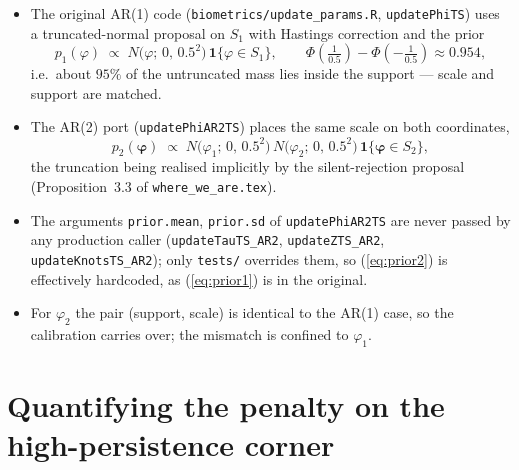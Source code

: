 \documentclass[11pt]{article}
\newcommand{\eref}[1]{(\ref{#1})}
\newcommand{\bphi}{\boldsymbol{\varphi}}
\newcommand{\ind}{\mathbf{1}}
\theoremstyle{plain}
\theoremstyle{definition}
\theoremstyle{remark}
\begin{document}
\begin{itemize}
  \item The original AR(1) code (\texttt{biometrics/update\_params.R},
        \texttt{updatePhiTS}) uses a truncated-normal proposal on $S_1$ with
        Hastings correction and the prior
        \begin{equation}\label{eq:prior1}
          p_1(\varphi)
          \;\propto\;
          N\!\bigl( \varphi ;\, 0,\, 0.5^2 \bigr)\,
          \ind\{ \varphi \in S_1 \},
          \qquad
          \Phi\!\left( \tfrac{1}{0.5} \right)
          - \Phi\!\left( -\tfrac{1}{0.5} \right)
          \approx 0.954,
        \end{equation}
        i.e.\ about $95\%$ of the untruncated mass lies inside the support
        --- scale and support are matched.
  \item The AR(2) port (\texttt{updatePhiAR2TS}) places the same scale on
        both coordinates,
        \begin{equation}\label{eq:prior2}
          p_2(\bphi)
          \;\propto\;
          N\!\bigl( \varphi_1 ;\, 0,\, 0.5^2 \bigr)\,
          N\!\bigl( \varphi_2 ;\, 0,\, 0.5^2 \bigr)\,
          \ind\{ \bphi \in S_2 \},
        \end{equation}
        the truncation being realised implicitly by the silent-rejection
        proposal (Proposition~3.3 of \texttt{where\_we\_are.tex}).
  \item The arguments \texttt{prior.mean}, \texttt{prior.sd} of
        \texttt{updatePhiAR2TS} are never passed by any production caller
        (\texttt{updateTauTS\_AR2}, \texttt{updateZTS\_AR2},
        \texttt{updateKnotsTS\_AR2}); only \texttt{tests/} overrides them, so
        \eref{eq:prior2} is effectively hardcoded, as \eref{eq:prior1} is in
        the original.
  \item For $\varphi_2$ the pair (support, scale) is identical to the AR(1)
        case, so the calibration carries over; the mismatch is confined to
        $\varphi_1$.
\end{itemize}

\section{Quantifying the penalty on the high-persistence corner}
\label{sec:penalty}
\end{document}
